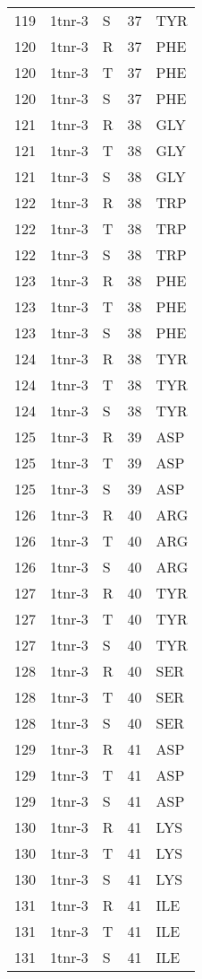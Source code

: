 \begin{tiny}
\begin{longtable}[l]{l|l|l|l|l}
	119 & 1tnr-3 & S & 37 & TYR \\
	120 & 1tnr-3 & R & 37 & PHE \\
	120 & 1tnr-3 & T & 37 & PHE \\
	120 & 1tnr-3 & S & 37 & PHE \\
	121 & 1tnr-3 & R & 38 & GLY \\
	121 & 1tnr-3 & T & 38 & GLY \\
	121 & 1tnr-3 & S & 38 & GLY \\
	122 & 1tnr-3 & R & 38 & TRP \\
	122 & 1tnr-3 & T & 38 & TRP \\
	122 & 1tnr-3 & S & 38 & TRP \\
	123 & 1tnr-3 & R & 38 & PHE \\
	123 & 1tnr-3 & T & 38 & PHE \\
	123 & 1tnr-3 & S & 38 & PHE \\
	124 & 1tnr-3 & R & 38 & TYR \\
	124 & 1tnr-3 & T & 38 & TYR \\
	124 & 1tnr-3 & S & 38 & TYR \\
	125 & 1tnr-3 & R & 39 & ASP \\
	125 & 1tnr-3 & T & 39 & ASP \\
	125 & 1tnr-3 & S & 39 & ASP \\
	126 & 1tnr-3 & R & 40 & ARG \\
	126 & 1tnr-3 & T & 40 & ARG \\
	126 & 1tnr-3 & S & 40 & ARG \\
	127 & 1tnr-3 & R & 40 & TYR \\
	127 & 1tnr-3 & T & 40 & TYR \\
	127 & 1tnr-3 & S & 40 & TYR \\
	128 & 1tnr-3 & R & 40 & SER \\
	128 & 1tnr-3 & T & 40 & SER \\
	128 & 1tnr-3 & S & 40 & SER \\
	129 & 1tnr-3 & R & 41 & ASP \\
	129 & 1tnr-3 & T & 41 & ASP \\
	129 & 1tnr-3 & S & 41 & ASP \\
	130 & 1tnr-3 & R & 41 & LYS \\
	130 & 1tnr-3 & T & 41 & LYS \\
	130 & 1tnr-3 & S & 41 & LYS \\
	131 & 1tnr-3 & R & 41 & ILE \\
	131 & 1tnr-3 & T & 41 & ILE \\
	131 & 1tnr-3 & S & 41 & ILE \\

\end{longtable}
\end{tiny}

